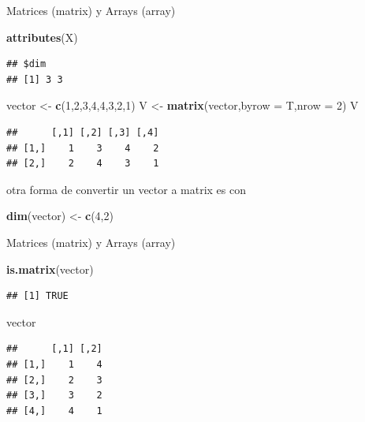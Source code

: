 \documentclass[ignorenonframetext,]{beamer}
\newenvironment{Shaded}{\begin{snugshade}}{\end{snugshade}}
\newcommand{\KeywordTok}[1]{\textcolor[rgb]{0.13,0.29,0.53}{\textbf{#1}}}
\newcommand{\DataTypeTok}[1]{\textcolor[rgb]{0.13,0.29,0.53}{#1}}
\newcommand{\DecValTok}[1]{\textcolor[rgb]{0.00,0.00,0.81}{#1}}
\newcommand{\StringTok}[1]{\textcolor[rgb]{0.31,0.60,0.02}{#1}}
\newcommand{\NormalTok}[1]{#1}
\begin{document}
\begin{frame}[fragile]{Matrices (matrix) y Arrays (array)}

\begin{Shaded}
\begin{Highlighting}[]
\KeywordTok{attributes}\NormalTok{(X)}
\end{Highlighting}
\end{Shaded}

\begin{verbatim}
## $dim
## [1] 3 3
\end{verbatim}

\begin{Shaded}
\begin{Highlighting}[]
\NormalTok{vector <-}\StringTok{ }\KeywordTok{c}\NormalTok{(}\DecValTok{1}\NormalTok{,}\DecValTok{2}\NormalTok{,}\DecValTok{3}\NormalTok{,}\DecValTok{4}\NormalTok{,}\DecValTok{4}\NormalTok{,}\DecValTok{3}\NormalTok{,}\DecValTok{2}\NormalTok{,}\DecValTok{1}\NormalTok{)}
\NormalTok{V <-}\StringTok{ }\KeywordTok{matrix}\NormalTok{(vector,}\DataTypeTok{byrow =}\NormalTok{ T,}\DataTypeTok{nrow =} \DecValTok{2}\NormalTok{)}
\NormalTok{V}
\end{Highlighting}
\end{Shaded}

\begin{verbatim}
##      [,1] [,2] [,3] [,4]
## [1,]    1    3    4    2
## [2,]    2    4    3    1
\end{verbatim}

otra forma de convertir un vector a matrix es con

\begin{Shaded}
\begin{Highlighting}[]
\KeywordTok{dim}\NormalTok{(vector) <-}\StringTok{ }\KeywordTok{c}\NormalTok{(}\DecValTok{4}\NormalTok{,}\DecValTok{2}\NormalTok{)}
\end{Highlighting}
\end{Shaded}

\end{frame}

\begin{frame}[fragile]{Matrices (matrix) y Arrays (array)}

\begin{Shaded}
\begin{Highlighting}[]
\KeywordTok{is.matrix}\NormalTok{(vector)}
\end{Highlighting}
\end{Shaded}

\begin{verbatim}
## [1] TRUE
\end{verbatim}

\begin{Shaded}
\begin{Highlighting}[]
\NormalTok{vector}
\end{Highlighting}
\end{Shaded}

\begin{verbatim}
##      [,1] [,2]
## [1,]    1    4
## [2,]    2    3
## [3,]    3    2
## [4,]    4    1
\end{verbatim}

\end{frame}
\end{document}
